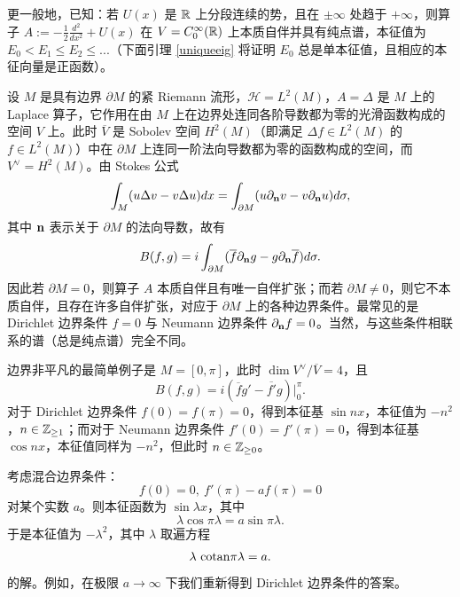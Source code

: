 \begin{remark} 更一般地，已知：若 $U(x)$ 是 $\Bbb R$ 上分段连续的势，且在 $\pm \infty$ 处趋于 $+\infty$，则算子 $A:=-\frac{1}{2}\frac{d^2}{dx^2}+U(x)$ 在 $V=C^\infty_0(\Bbb R)$ 上本质自伴并具有纯点谱，本征值为 $E_0< E_1\le E_2\le ...$（下面引理 \ref{uniqueeig} 将证明 $E_0$ 总是单本征值，且相应的本征向量是正函数）。
\end{remark}

\begin{example} 设 $M$ 是具有边界 $\partial M$ 的紧 Riemann 流形，$\mathcal H=L^2(M)$，$A=\Delta$ 是 $M$ 上的 Laplace 算子，它作用在由 $M$ 上在边界处连同各阶导数都为零的光滑函数构成的空间 $V$ 上。此时 $\overline V$ 是 Sobolev 空间 $H^2(M)$（即满足 $\Delta f\in L^2(M)$ 的 $f\in L^2(M)$）中在 $\partial M$ 上连同一阶法向导数都为零的函数构成的空间，而 $V^\vee=H^2(M)$。由 Stokes 公式
$$
\int_M (u\Delta v-v\Delta u)dx=\int_{\partial M}(u\partial_{\bold n} v-v\partial_{\bold n}u)d\sigma,
$$
其中 $\bold n$ 表示关于 $\partial M$ 的法向导数，故有
$$
B(f,g)=i\int_{\partial M}(\overline f\partial_{\bold n} g-g\partial_{\bold n} \overline f)d\sigma.
$$
因此若 $\partial M=0$，则算子 $A$ 本质自伴且有唯一自伴扩张；而若 $\partial M\ne 0$，则它不本质自伴，且存在许多自伴扩张，对应于 $\partial M$ 上的各种边界条件。最常见的是 Dirichlet 边界条件 $f=0$ 与 Neumann 边界条件 $\partial_{\bold n} f=0$。当然，与这些条件相联系的谱（总是纯点谱）完全不同。

边界非平凡的最简单例子是 $M=[0,\pi]$，此时 $\dim V^\vee/\overline V=4$，且
$$
B(f,g)=i(\overline {f}g'-\overline{f'}g)|_0^{\pi}.
$$
对于 Dirichlet 边界条件 $f(0)=f(\pi)=0$，得到本征基 $\sin nx$，本征值为 $-n^2$，$n\in \Bbb Z_{\ge 1}$；而对于 Neumann 边界条件 $f'(0)=f'(\pi)=0$，得到本征基 $\cos nx$，本征值同样为 $-n^2$，但此时 $n\in \Bbb Z_{\ge 0}$。

考虑混合边界条件：
$$
f(0)=0,\ f'(\pi)-af(\pi)=0
$$
对某个实数 $a$。则本征函数为 $\sin \lambda x$，其中
$$
\lambda \cos \pi \lambda = a \sin \pi\lambda.
$$
于是本征值为 $-\lambda^2$，其中 $\lambda$ 取遍方程
$$
\lambda\ {\rm cotan} \pi\lambda=a.
$$
的解。例如，在极限 $a\to \infty$ 下我们重新得到 Dirichlet 边界条件的答案。
\end{example}


